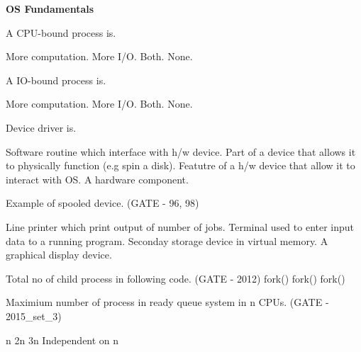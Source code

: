 
\centerline{\textbf{ \LARGE OS Fundamentals}}

\setcounter{question}{0}

\question A CPU-bound process is.

\begin{oneparchoices}
   \choice More computation.
   \choice More I/O.
   \choice Both.
   \choice None.
\end{oneparchoices}


\question A IO-bound process is.

\begin{oneparchoices}
   \choice More computation.
   \choice More I/O.
   \choice Both.
   \choice None.
\end{oneparchoices}


\question Device driver is.

  \begin{choices}
    \choice Software routine which interface with h/w device.
    \choice Part of a device that allows it to physically function (e.g spin a disk).
    \choice Featutre of a h/w device that allow it to interact with OS.
    \choice A hardware component.
  \end{choices}

  \question Example of spooled device. (GATE - 96, 98)

  \begin{choices}
    \choice Line printer which print output of number of jobs.
    \choice Terminal used to enter input data to a running program.
    \choice Seconday storage device in virtual memory.
    \choice A graphical display device.
  \end{choices}

  \question  Total no of child process in following code. (GATE - 2012) \newline
    fork()  \newline fork()  \newline  fork()

  \begin{oneparchoices}
  \end{oneparchoices}

  \question Maximium number of process in ready queue system in n CPUs. (GATE - 2015\_set\_3)

  \begin{oneparchoices}
    \choice n
    \choice 2n
    \choice 3n
    \choice Independent on n
  \end{oneparchoices}

\begin{comment}

  \question  (GATE - )

  \begin{choices}
    \choice
    \choice
    \choice
    \choice
  \end{choices}


\end{comment}
